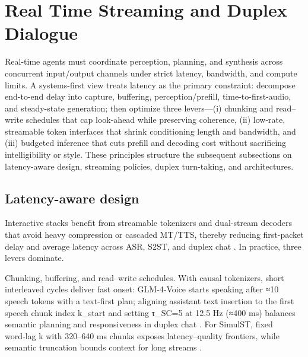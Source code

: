 \section{Real Time Streaming and Duplex Dialogue} \label{sec:Real Time Streaming and Duplex Dialogue}

\noindent Real-time agents must coordinate perception, planning, and synthesis across concurrent input/output channels under strict latency, bandwidth, and compute limits. A systems-first view treats latency as the primary constraint: decompose end-to-end delay into capture, buffering, perception/prefill, time-to-first-audio, and steady-state generation; then optimize three levers—(i) chunking and read–write schedules that cap look-ahead while preserving coherence, (ii) low-rate, streamable token interfaces that shrink conditioning length and bandwidth, and (iii) budgeted inference that cuts prefill and decoding cost without sacrificing intelligibility or style. These principles structure the subsequent subsections on latency-aware design, streaming policies, duplex turn-taking, and architectures.



\subsection{Latency-aware design} \label{subsec:Latency-aware design}

Interactive stacks benefit from streamable tokenizers and dual-stream decoders that avoid heavy compression or cascaded MT/TTS, thereby reducing first-packet delay and average latency across ASR, S2ST, and duplex chat \cite{li2025continuousspeechtokenizertext,har-tuv2025pastphoneticacousticspeechtokenizer,bai2025dmelspeechtokenizationmadesimple,zhao2024textlessstreamingspeechtranslationsemant,sheng2025syncspeechlowlatencyefficientdualstreamt}. In practice, three levers dominate.

Chunking, buffering, and read–write schedules. With causal tokenizers, short interleaved cycles deliver fast onset: GLM‑4‑Voice starts speaking after ≈10 speech tokens with a text‑first plan; aligning assistant text insertion to the first speech chunk index k_start and setting τ_SC=5 at 12.5 Hz (≈400 ms) balances semantic planning and responsiveness in duplex chat \cite{zeng2024glm4voicetowardsintelligenthumanlikeends,cui2025thinkbeforeyoutalkenhancingmeaningfuldia}. For SimulST, fixed word‑lag k with 320–640 ms chunks exposes latency–quality frontiers, while semantic truncation bounds context for long streams \cite{guo2025streamuniachievingstreamingspeechtransla}.

